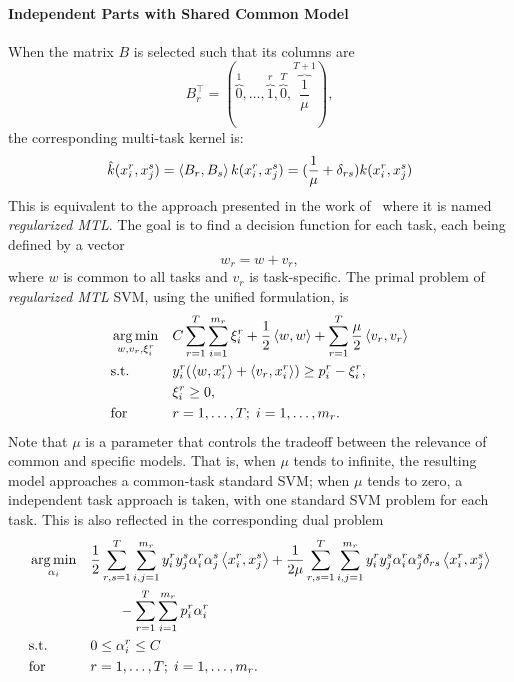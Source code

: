 \paragraph*{Independent Parts with Shared Common Model}
When the matrix $B$ is selected such that its columns are
$$B_r^\intercal =  (\overbrace{0}^1, \ldots, \overbrace{1}^{r}, \overbrace{0}^T, \overbrace{\frac{1}{\mu}}^{T+1}), $$
the corresponding multi-task kernel is:
\begin{equation}
    \nonumber
    \hat{k}(x_i^r, x_j^s) = \left\langle B_r, B_s \right\rangle k(x_i^r, x_j^s) = ( \frac{1}{\mu} + \delta_{rs}) k(x_i^r, x_j^s)
\end{equation}
This is equivalent to the approach presented in the work of~\cite{EvgeniouP04} where it is named \emph{regularized MTL}.
The goal is to find a decision function for each task, each being defined by a vector
$$w_r = w + v_r,$$
where $w$ is common to all tasks and $v_r$ is task-specific.
The primal problem of \emph{regularized MTL} SVM, using the unified formulation, is 
\begin{equation}
    \label{eq:regmtlsvm_primal}
    \begin{aligned}
        & \argmin_{w, v_r, \xi_i^r}
        & & C \sum_{r=1}^\ntasks \sum_{i=1}^{\npertask_r} \xi_i^r + \frac{1}{2} \dotp{w}{w} + \sum_{r=1}^\ntasks \frac{\mu}{2} \dotp{v_r}{v_r} \\
        & \text{s.t.}
        & & y_{i}^r ( \dotp{w}{x_{i}^r} + \dotp{v_r}{x_{i}^r}) \geq p_i^r - \xi_i^r ,\\
        & & &\xi_i^r \geq 0, \\
        & \text{for } & & r=1, \ldots, \ntasks; \; i=1, \ldots, \npertask_r.
    \end{aligned}
\end{equation}
Note that $\mu$ is a parameter that controls the tradeoff between the relevance of common and specific models. That is, when $\mu$ tends to infinite, the resulting model approaches a common-task standard SVM; when $\mu$ tends to zero, a independent task approach is taken, with one standard SVM problem for each task.
This is also reflected in the corresponding dual problem
\begin{equation}\label{eq:regmtlsvm_dual}
    \begin{aligned}
        & \argmin_{\alpha_i} 
        & & \frac{1}{2} \sum_{r, s=1}^\ntasks \sum_{i, j=1}^{\npertask_r} y_i^r y_j^s \alpha_i^r \alpha_j^s \dotp{x_i^r}{x_j^s} + \frac{1}{2 \mu} \sum_{r, s=1}^\ntasks  \sum_{i, j=1}^{\npertask_r} y_i^r y_j^s \alpha_i^r \alpha_j^s \delta_{rs} \dotp{x_i^r}{x_j^s} \\
        & & & \qquad - \sum_{r=1}^\ntasks \sum_{i=1}^{\npertask_r} p_i^r \alpha_i^r \\
        & \text{s.t.}
        & & 0 \leq \alpha_i^r \leq C \\
        & \text{for } & & r=1, \ldots, \ntasks; \; i=1, \ldots, \npertask_r.
        \end{aligned}
\end{equation}
